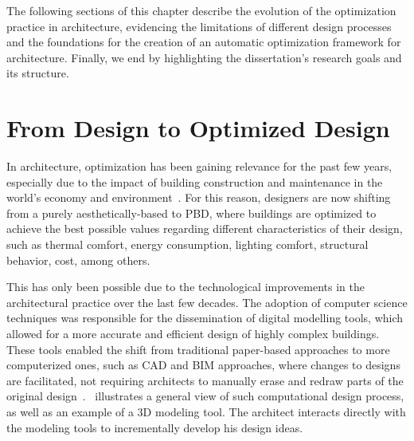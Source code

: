 	The following sections of this chapter describe the evolution of the optimization practice in architecture, evidencing the limitations of different design processes and the foundations for the creation of an automatic optimization framework for architecture. Finally, we end by highlighting the dissertation's research goals and its structure.

\section{From Design to Optimized Design}
	
	In architecture, optimization has been gaining relevance for the past few years, especially due to the impact of building construction and maintenance in the world's economy and environment~\cite{Attia2013, Shi2016}. For this reason, designers are now shifting from a purely aesthetically-based to \ac{PBD}, where buildings are optimized to achieve the best possible values regarding different characteristics of their design, such as thermal comfort, energy consumption, lighting comfort, structural behavior, cost, among others.

	This has only been possible due to the technological improvements in the architectural practice over the last few decades. The adoption of computer science techniques was responsible for the dissemination of digital modelling tools, which allowed for a more accurate and efficient design of highly complex buildings. These tools enabled the shift from traditional paper-based approaches to more computerized ones, such as \ac{CAD} and \ac{BIM} approaches, where changes to designs are facilitated, not requiring architects to manually erase and redraw parts of the original design~\cite{Ferreira2015GD}.~ illustrates a general view of such computational design process, as well as an example of a 3D modeling tool. The architect interacts directly with the modeling tools to incrementally develop his design ideas.
	
